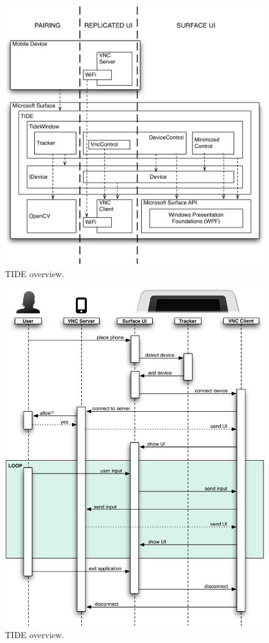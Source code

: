 \begin{figure}[htb]
  \centering
    \includegraphics[width=1\textwidth]{images/overview}
    \caption{TIDE overview.}
    \label{fig:overview}
\end{figure}

\begin{figure}[htb]
  \centering
    \includegraphics[width=1\textwidth]{images/sequenceOverview}
    \caption{TIDE overview.}
    \label{fig:sequenceOverview}
\end{figure}

